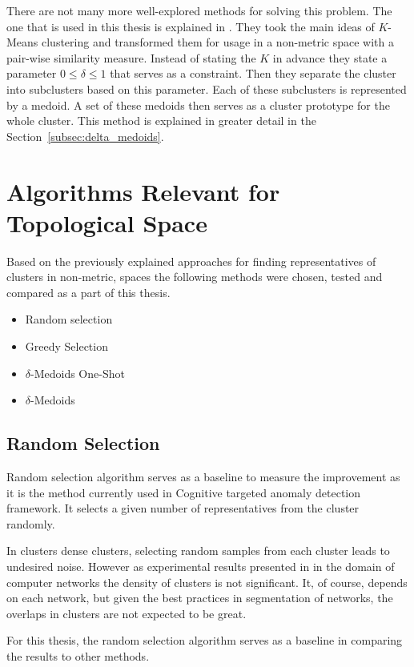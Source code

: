 \documentclass[thesis=B,english]{FITthesis}[2012/10/20]
\begin{document}
There are not many more well-explored methods for solving this problem.
The one that is used in this thesis is explained in \cite{liebman2015representative}.
They took the main ideas of $K$-Means clustering and transformed them for usage in a non-metric space with a pair-wise similarity measure.
Instead of stating the $K$ in advance they state a parameter  $ 0 \leq \delta \leq 1$ that serves as a constraint.
Then they separate the cluster into subclusters based on this parameter.
Each of these subclusters is represented by a medoid.
A set of these medoids then serves as a cluster prototype for the whole cluster.
This method is explained in greater detail in the Section~\ref{subsec:delta_medoids}.

\section{Algorithms Relevant for Topological Space}\label{sec:relevant_methods}
Based on the previously explained approaches for finding representatives of clusters in non-metric, spaces the following methods were chosen, tested and compared as a part of this thesis.
\begin{itemize}
    \item Random selection
    \item Greedy Selection
    \item $\delta$-Medoids One-Shot
    \item $\delta$-Medoids
\end{itemize}

\subsection{Random Selection}\label{subsec:random_select}

Random selection algorithm serves as a baseline to measure the improvement as it is the method currently used in Cognitive targeted anomaly detection framework.
It selects a given number of representatives from the cluster randomly.

In clusters dense clusters, selecting random samples from each cluster leads to undesired noise.
However as experimental results presented in \cite{kopp2018community} in the domain of computer networks the density of clusters is not significant.
It, of course, depends on each network, but given the best practices in segmentation of networks, the overlaps in clusters are not expected to be great.

For this thesis, the random selection algorithm serves as a baseline in comparing the results to other methods.
\end{document}
